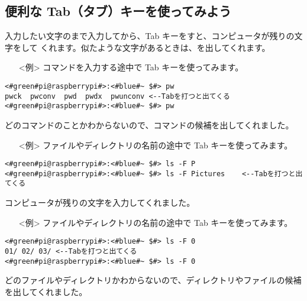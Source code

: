 \subsection{便利な Tab（タブ）キーを使ってみよう}
入力したい文字のまで入力してから、Tab キーをすと、コンピュータが残りの文字をして
くれます。似たような文字があるときは、を出してくれます。
\begin{itemize}
\item[<例>]コマンドを入力する途中で Tab キーを使ってみます。
\end{itemize}
\begin{lstlisting}[caption=Tabの例1, label=Tab1]
<#green#pi@raspberrypi#>:<#blue#~ $#> pw
pwck  pwconv  pwd  pwdx  pwunconv <--Tabを打つと出てくる
<#green#pi@raspberrypi#>:<#blue#~ $#> pw
\end{lstlisting}
どのコマンドのことかわからないので、コマンドの候補を出してくれました。
\begin{itemize}
\item[<例>]ファイルやディレクトリの名前の途中で Tab キーを使ってみます。
\end{itemize}
\begin{lstlisting}[caption=Tabの例2, label=Tab2]
<#green#pi@raspberrypi#>:<#blue#~ $#> ls -F P
<#green#pi@raspberrypi#>:<#blue#~ $#> ls -F Pictures	<--Tabを打つと出てくる
\end{lstlisting}
コンピュータが残りの文字を入力してくれました。
\begin{itemize}
\item[<例>]ファイルやディレクトリの名前の途中で Tab キーを使ってみます。
\end{itemize}
\begin{lstlisting}[caption=Tabの例3, label=Tab3]
<#green#pi@raspberrypi#>:<#blue#~ $#> ls -F 0
01/	02/	03/	<--Tabを打つと出てくる
<#green#pi@raspberrypi#>:<#blue#~ $#> ls -F 0
\end{lstlisting}
どのファイルやディレクトリかわからないので、ディレクトリやファイルの候補を出してくれました。

\begin{figure}[b]
\begin{tcolorbox}[title=\useOmetoi]
\begin{enumerate}
\end{enumerate}
\end{tcolorbox}
\end{figure}

